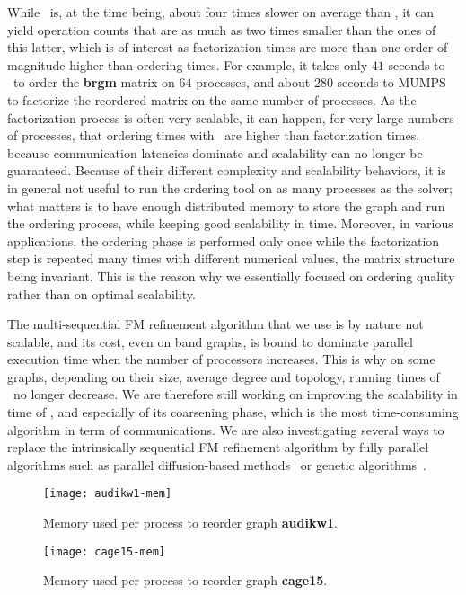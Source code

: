\documentclass[fleqn,12pt,twoside]{article}
\begin{document}
While \ptscotch\ is, at the time being, about four times slower on
average than \parmetis, it can yield operation counts that are as much
as two times smaller than the ones of this latter, which is of interest
as factorization times are more than one order of magnitude higher
than ordering times. For example, it takes only $41$ seconds to
\ptscotch\ to order the \textbf{brgm} matrix on $64$ processes, and
about $280$ seconds to {\sc MUMPS}~\cite{amdule00} to factorize the
reordered matrix on the same number of processes.
As the factorization process is often very scalable, it can
happen, for very large numbers of processes, that ordering times with
\ptscotch\ are higher than factorization times, because
communication latencies dominate and scalability can no longer be
guaranteed. Because of their different complexity and scalability
behaviors, it is in general not useful to run the ordering tool on as
many processes as the solver; what matters is to have enough
distributed memory to store the graph and run the ordering process,
while keeping good scalability in time.
Moreover, in various applications, the ordering phase is performed
only once while the factorization step is repeated many times with
different numerical values, the matrix structure being invariant. This
is the reason why we essentially focused on ordering quality rather
than on optimal scalability.

The multi-sequential FM refinement algorithm that we use is by nature
not scalable, and its cost, even on band graphs, is bound to dominate
parallel execution time when the number of processors increases. This
is why on some graphs, depending on their size, average degree and
topology, running times of \ptscotch\ no longer decrease. We are
therefore still working on improving the scalability in time of
\ptscotch, and especially of its coarsening phase, which is the most
time-consuming algorithm in term of communications. We are also
investigating several ways to replace the intrinsically sequential FM
refinement algorithm by fully parallel algorithms such as parallel
diffusion-based methods~\cite{pell07b} or genetic
algorithms~\cite{chpe06a}.

\begin{figure}[htb]
\begin{minipage}[t]{0.47\textwidth}
\texttt{[image: audikw1-mem]}
\vspace*{-3.5em}
\caption{Memory used per process to reorder graph \textbf{audikw1}.}
\label{fig:audikw1-mem}
\end{minipage}\hspace{\fill}\begin{minipage}[t]{0.47\textwidth}
\texttt{[image: cage15-mem]}
\vspace*{-3.5em}
\caption{Memory used per process to reorder graph \textbf{cage15}.}
\label{fig:cage15-mem}
\end{minipage}
\end{figure}
\end{document}
